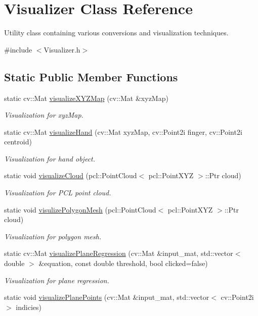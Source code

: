 \hypertarget{class_visualizer}{}\section{Visualizer Class Reference}
\label{class_visualizer}


Utility class containing various conversions and visualization techniques.  




{\ttfamily \#include $<$Visualizer.\+h$>$}

\subsection*{Static Public Member Functions}
\begin{DoxyCompactItemize}
\item 
static cv\+::\+Mat \hyperlink{class_visualizer_a24caf117be9878e2f5ad35cabb7f4f88}{visualize\+X\+Y\+Z\+Map} (cv\+::\+Mat \&xyz\+Map)
\begin{DoxyCompactList}\small\item\em Visualization for xyz\+Map. \end{DoxyCompactList}\item 
static cv\+::\+Mat \hyperlink{class_visualizer_aa4436945eb7f9220b55d46914e8c5005}{visualize\+Hand} (cv\+::\+Mat xyz\+Map, cv\+::\+Point2i finger, cv\+::\+Point2i centroid)
\begin{DoxyCompactList}\small\item\em Visualization for hand object. \end{DoxyCompactList}\item 
static void \hyperlink{class_visualizer_af65e36aaef7c1f60d0f79819f17707d7}{visualize\+Cloud} (pcl\+::\+Point\+Cloud$<$ pcl\+::\+Point\+X\+YZ $>$\+::Ptr cloud)
\begin{DoxyCompactList}\small\item\em Visualization for P\+CL point cloud. \end{DoxyCompactList}\item 
static void \hyperlink{class_visualizer_a82702715f2ac30e555ccad3339375bf8}{visulize\+Polygon\+Mesh} (pcl\+::\+Point\+Cloud$<$ pcl\+::\+Point\+X\+YZ $>$\+::Ptr cloud)
\begin{DoxyCompactList}\small\item\em Visualization for polygon mesh. \end{DoxyCompactList}\item 
static cv\+::\+Mat \hyperlink{class_visualizer_a448063633391ee4ae2af595fe760aab0}{visualize\+Plane\+Regression} (cv\+::\+Mat \&input\+\_\+mat, std\+::vector$<$ double $>$ \&equation, const double threshold, bool clicked=false)
\begin{DoxyCompactList}\small\item\em Visualization for plane regression. \end{DoxyCompactList}\item 
static void \hyperlink{class_visualizer_acdc7b3fa2c57bddb1de863101c690d51}{visualize\+Plane\+Points} (cv\+::\+Mat \&input\+\_\+mat, std\+::vector$<$ cv\+::\+Point2i $>$ indicies)
\end{DoxyCompactItemize}
